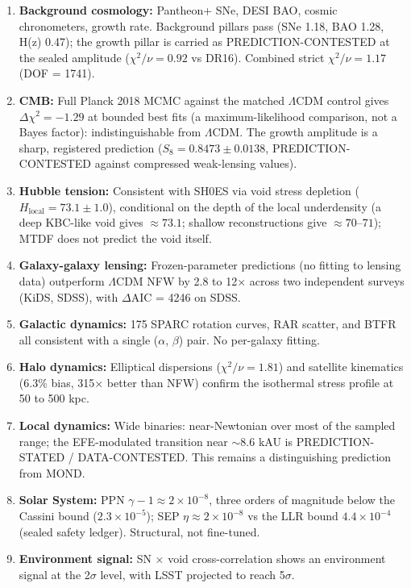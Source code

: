\documentclass[11pt,a4paper]{article}
\begin{document}
\begin{enumerate}
  \item \textbf{Background cosmology:} Pantheon+ SNe, DESI BAO, cosmic chronometers, growth rate. Background pillars pass (SNe 1.18, BAO 1.28, H(z) 0.47); the growth pillar is carried as PREDICTION-CONTESTED at the sealed amplitude ($\chi^2/\nu = 0.92$ vs DR16). Combined strict $\chi^2/\nu = 1.17$ (DOF = 1741).
  \item \textbf{CMB:} Full Planck 2018 MCMC against the matched $\Lambda$CDM control gives $\Delta\chi^2 = -1.29$ at bounded best fits (a maximum-likelihood comparison, not a Bayes factor): indistinguishable from $\Lambda$CDM. The growth amplitude is a sharp, registered prediction ($S_8 = 0.8473 \pm 0.0138$, PREDICTION-CONTESTED against compressed weak-lensing values).
  \item \textbf{Hubble tension:} Consistent with SH0ES via void stress depletion ($H_\text{local} = 73.1 \pm 1.0$), conditional on the depth of the local underdensity (a deep KBC-like void gives $\approx 73.1$; shallow reconstructions give $\approx 70$--$71$); MTDF does not predict the void itself.
  \item \textbf{Galaxy-galaxy lensing:} Frozen-parameter predictions (no fitting to lensing data) outperform $\Lambda$CDM NFW by 2.8 to 12$\times$ across two independent surveys (KiDS, SDSS), with $\Delta$AIC = 4246 on SDSS.
  \item \textbf{Galactic dynamics:} 175 SPARC rotation curves, RAR scatter, and BTFR all consistent with a single ($\alpha$, $\beta$) pair. No per-galaxy fitting.
  \item \textbf{Halo dynamics:} Elliptical dispersions ($\chi^2/\nu = 1.81$) and satellite kinematics (6.3\% bias, 315$\times$ better than NFW) confirm the isothermal stress profile at 50 to 500 kpc.
  \item \textbf{Local dynamics:} Wide binaries: near-Newtonian over most of the sampled range; the EFE-modulated transition near $\sim 8.6$ kAU is PREDICTION-STATED / DATA-CONTESTED. This remains a distinguishing prediction from MOND.
  \item \textbf{Solar System:} PPN $\gamma - 1 \approx 2\times10^{-8}$, three orders of magnitude below the Cassini bound ($2.3\times10^{-5}$); SEP $\eta \approx 2\times10^{-8}$ vs the LLR bound $4.4\times10^{-4}$ (sealed safety ledger). Structural, not fine-tuned.
  \item \textbf{Environment signal:} SN $\times$ void cross-correlation shows an environment signal at the 2$\sigma$ level, with LSST projected to reach 5$\sigma$.
\end{enumerate}
\end{document}
